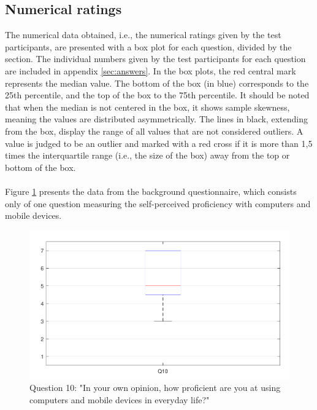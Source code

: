 \documentclass[english, 12pt, a4paper, pdftex, elec, utf8]{aaltothesis}
\begin{document}
\subsection{Numerical ratings} \label{sec:numerical}

The numerical data obtained, i.e., the numerical ratings given by the test participants, are presented with a box plot for each question, divided by the section. The individual numbers given by the test participants for each question are included in appendix \ref{sec:answers}. In the box plots, the red central mark represents the median value. The bottom of the box (in blue) corresponds to the 25th percentile, and the top of the box to the 75th percentile. It should be noted that when the median is not centered in the box, it shows sample skewness, meaning the values are distributed asymmetrically. The lines in black, extending from the box, display the range of all values that are not considered outliers. A value is judged to be an outlier and marked with a red cross if it is more than 1,5 times the interquartile range (i.e., the size of the box) away from the top or bottom of the box. \cite{boxplot} \\\\
Figure \ref{fig:results1} presents the data from the background questionnaire, which consists only of one question measuring the self-perceived proficiency with computers and mobile devices. 
\begin{figure}[t]
    \centering
    \includegraphics[width=\textwidth]{T2_box1.pdf}
    \caption{Question 10: "In your own opinion, how proficient are you at using computers and mobile devices in everyday life?"}
    \label{fig:results1} 
\end{figure}
\end{document}
